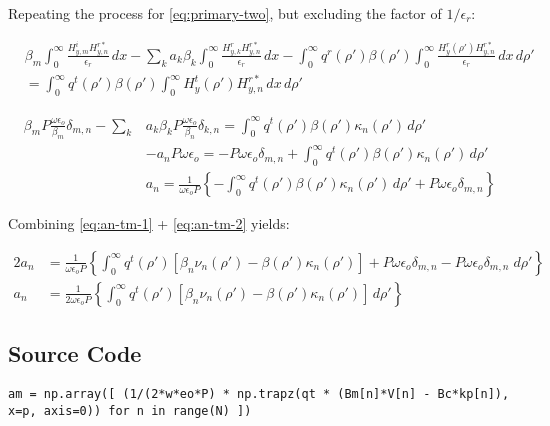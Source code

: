 \documentclass[11pt, oneside]{article}   	%
\begin{document}
\noindent Repeating the process for \eqref{eq:primary-two}, but excluding the factor of $1/\epsilon_{r}$:

\begin{align}
&\beta_{m}\int_{0}^{\infty} \frac{H_{y,m}^{i} H_{y,n}^{r*}}{\epsilon_{r}} \, dx
- \sum_{k} a_{k} \beta_{k} \int_{0}^{\infty}  \frac{H_{y,k}^{r} H_{y,n}^{r*}}{\epsilon_{r}}\, dx 
- \int_{0}^{\infty} q^{r} (\rho ') \beta(\rho ')\int_{0}^{\infty} \frac{H_{y}^{r} (\rho ') H_{y,n}^{r*}}{\epsilon_{r}} \, dx \, d\rho ' \nonumber \\
&= \int_{0}^{\infty} q^{t} (\rho ') \beta(\rho ')\int_{0}^{\infty} H_{y}^{t} (\rho ') H_{y,n}^{r*} \, dx \, d\rho '
\end{align}

\begin{align}
\beta_{m} P \frac{\omega \epsilon_{o}}{\beta_{m}}\delta_{m,n} - \sum_{k} &a_{k} \beta_{k} P \frac{\omega \epsilon_{o}}{\beta_{n}}\delta_{k,n}
= \int_{0}^{\infty} q^{t} (\rho ') \beta(\rho ') \kappa_{n}(\rho ') \, d\rho ' \nonumber \\
&-a_{n} P \omega \epsilon_{o}
= -P \omega \epsilon_{o}\delta_{m,n} + \int_{0}^{\infty} q^{t} (\rho ') \beta(\rho ') \kappa_{n}(\rho ') \, d\rho ' \nonumber \\
&a_{n} = \frac{1}{\omega \epsilon_{o} P} \left\{-\int_{0}^{\infty} q^{t} (\rho ') \beta(\rho ')\kappa_{n}(\rho ') \, d\rho ' +P \omega \epsilon_{o}\delta_{m,n} \right\}
\label{eq:an-tm-2}
\end{align}

Combining \eqref{eq:an-tm-1} + \eqref{eq:an-tm-2} yields:

\begin{align}
2 a_{n} &= \frac{1}{\omega \epsilon_{o} P} \left\{\int_{0}^{\infty} q^{t} (\rho ') [\beta_{n}\nu_{n}(\rho ') - \beta(\rho ')\kappa_{n}(\rho ')] +P \omega \epsilon_{o}\delta_{m,n} - P \omega \epsilon_{o}\delta_{m,n} \; d\rho ' \right\} \nonumber \\
a_{n} &= \frac{1}{2 \omega \epsilon_{o} P} \left\{\int_{0}^{\infty} q^{t} (\rho ') [\beta_{n}\nu_{n}(\rho ') - \beta(\rho ')\kappa_{n}(\rho ')] \, d\rho ' \right\}
\end{align}


\subsection{Source Code}

\begin{lstlisting}
am = np.array([ (1/(2*w*eo*P) * np.trapz(qt * (Bm[n]*V[n] - Bc*kp[n]), x=p, axis=0)) for n in range(N) ])
\end{lstlisting}
\end{document}
